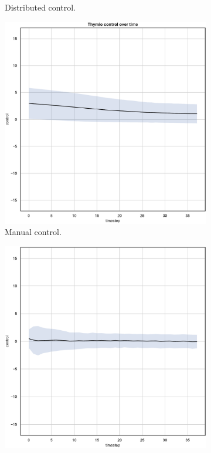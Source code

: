 \begin{figure}[!htb]
\begin{center}
\begin{subfigure}[h]{0.35\textwidth}
			\caption{Distributed control.}
		\end{subfigure}
	\end{center}
	\begin{center}
		\begin{subfigure}[h]{0.35\textwidth}			
			\includegraphics[width=\textwidth]{contents/images/net-d6/control-overtime-manual}%
			\caption{Manual control.}
		\end{subfigure}
		\hspace{1cm}
		\begin{subfigure}[h]{0.35\textwidth}
			\includegraphics[width=\textwidth]{contents/images/net-c6/control-overtime-learned_communication}

\end{subfigure}
\end{center}
\end{figure}
